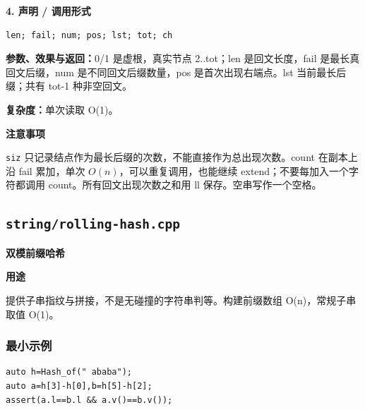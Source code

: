 \documentclass[UTF8,a4paper,10pt]{ctexart}
\newcommand{\TemplUsage}[1]{\textbf{用途}\par #1\par}
\newcommand{\TemplNote}[1]{\textbf{注意事项}\par #1\par}
\begin{document}
\noindent\begin{minipage}{\textwidth}
\textbf{4. 声明 / 调用形式}
\begin{lstlisting}
len; fail; num; pos; lst; tot; ch
\end{lstlisting}
\textbf{参数、效果与返回：}0/1 是虚根，真实节点 2..tot；len 是回文长度，fail 是最长真回文后缀，num 是不同回文后缀数量，pos 是首次出现右端点。lst 当前最长后缀；共有 tot-1 种非空回文。

\textbf{复杂度：}单次读取 O(1)。

\TemplNote{\texttt{siz} 只记录结点作为最长后缀的次数，不能直接作为总出现次数。count 在副本上沿 fail 累加，单次 $O(n)$，可以重复调用，也能继续 extend；不要每加入一个字符都调用 count。所有回文出现次数之和用 ll 保存。空串写作一个空格。}
\end{minipage}\par\vspace{0.4em}
\clearpage
\subsection{\texttt{string/rolling-hash.cpp}}
\textbf{双模前缀哈希}\par
\TemplUsage{提供子串指纹与拼接，不是无碰撞的字符串判等。构建前缀数组 O(n)，常规子串取值 O(1)。}
\subsubsection*{最小示例}
\begin{lstlisting}
auto h=Hash_of(" ababa");
auto a=h[3]-h[0],b=h[5]-h[2];
assert(a.l==b.l && a.v()==b.v());
\end{lstlisting}
\end{document}
